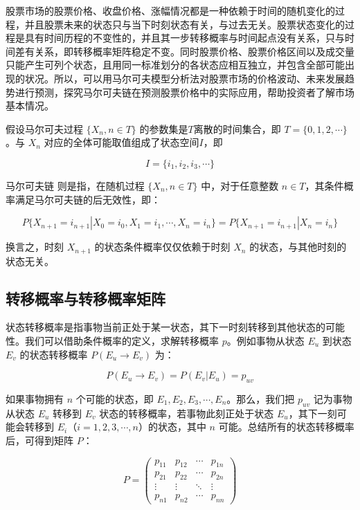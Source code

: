 \documentclass[a4paper]{article}
\begin{document}
股票市场的股票价格、收盘价格、涨幅情况都是一种依赖于时间的随机变化的过程，并且股票未来的状态只与当下时刻状态有关，与过去无关。股票状态变化的过程是具有时间历程的不变性的，并且其一步转移概率与时间起点没有关系，只与时间差有关系，即转移概率矩阵稳定不变。同时股票价格、股票价格区间以及成交量只能产生可列个状态，且用同一标准划分的各状态应相互独立，并包含全部可能出现的状况\cite{chen2014markov}。所以，可以用马尔可夫模型分析法对股票市场的价格波动、未来发展趋势进行预测，探究马尔可夫链在预测股票价格中的实际应用，帮助投资者了解市场基本情况。

假设马尔可夫过程 $\{X_n, n \in T\}$ 的参数集是$T$离散的时间集合，即 $T = \{0, 1, 2, \cdots\}$。与 $X_n$ 对应的全体可能取值组成了状态空间$I$，即

\[ I = \{i_1, i_2, i_3, \cdots\} \]

马尔可夫链 \cite{zhang2004applied} 则是指，在随机过程 $\{X_n, n \in T\}$ 中，对于任意整数 $n \in T$，其条件概率满足马尔可夫链的后无效性，即：

\[ P \{X_{n+1} = i_{n+1}|X_0 = i_0, X_1 = i_1, \cdots, X_n = i_n\} = P \{X_{n+1} = i_{n+1}|X_n = i_n\} \]

换言之，时刻 $X_{n+1}$ 的状态条件概率仅仅依赖于时刻 $X_n$ 的状态，与其他时刻的状态无关。\cite*{fu2023prediction}

\subsection{转移概率与转移概率矩阵}

状态转移概率是指事物当前正处于某一状态，其下一时刻转移到其他状态的可能性。我们可以借助条件概率的定义，求解转移概率 \( p \)。例如事物从状态 \( E_u \) 到状态 \( E_v \) 的状态转移概率 \( P(E_u \rightarrow E_v) \) 为：

\[
P(E_u \rightarrow E_v) = P(E_v | E_u) = p_{uv}
\]

如果事物拥有 \( n \) 个可能的状态，即 \( E_1, E_2, E_3, \cdots, E_n \)。那么，我们把 \( p_{uv} \) 记为事物从状态 \( E_u \) 转移到 \( E_v \) 状态的转移概率，若事物此刻正处于状态 \( E_u \)，其下一刻可能会转移到 \( E_i \)（\( i = 1, 2, 3, \cdots, n \)）的状态，其中 \( n \) 可能。总结所有的状态转移概率后，可得到矩阵 \( P \)：

\[
P = 
\begin{pmatrix}
p_{11} & p_{12} & \cdots & p_{1n} \\
p_{21} & p_{22} & \cdots & p_{2n} \\
\vdots & \vdots & \ddots & \vdots \\
p_{n1} & p_{n2} & \cdots & p_{nn}
\end{pmatrix}
\]
\end{document}
